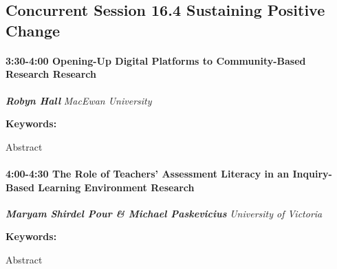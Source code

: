 \documentclass[
]{book}
\begin{document}
\hypertarget{concurrent-session-16.4-sustaining-positive-change}{%
\subsection*{Concurrent Session 16.4 \textbar{} Sustaining Positive Change}\label{concurrent-session-16.4-sustaining-positive-change}}

\begin{session}
\hypertarget{opening-up-digital-platforms-to-community-based-research-research}{%
\paragraph*{\texorpdfstring{3:30-4:00 \textbar{} \textbf{Opening-Up
Digital Platforms to Community-Based Research} \textbar{}
Research}{3:30-4:00 \textbar{} Opening-Up Digital Platforms to Community-Based Research \textbar{} Research}}\label{opening-up-digital-platforms-to-community-based-research-research}}

\textbf{\emph{Robyn Hall}} \textbar{} \emph{MacEwan University}

\textbf{Keywords:}

Abstract
\end{session}

\begin{session}
\hypertarget{the-role-of-teachers-assessment-literacy-in-an-inquiry-based-learning-environment-research}{%
\paragraph*{\texorpdfstring{4:00-4:30 \textbar{} \textbf{The Role of
Teachers' Assessment Literacy in an Inquiry-Based Learning Environment}
\textbar{}
Research}{4:00-4:30 \textbar{} The Role of Teachers' Assessment Literacy in an Inquiry-Based Learning Environment \textbar{} Research}}\label{the-role-of-teachers-assessment-literacy-in-an-inquiry-based-learning-environment-research}}

\textbf{\emph{Maryam Shirdel Pour \& Michael Paskevicius}} \textbar{}
\emph{University of Victoria}

\textbf{Keywords:}

Abstract
\end{session}
\end{document}
